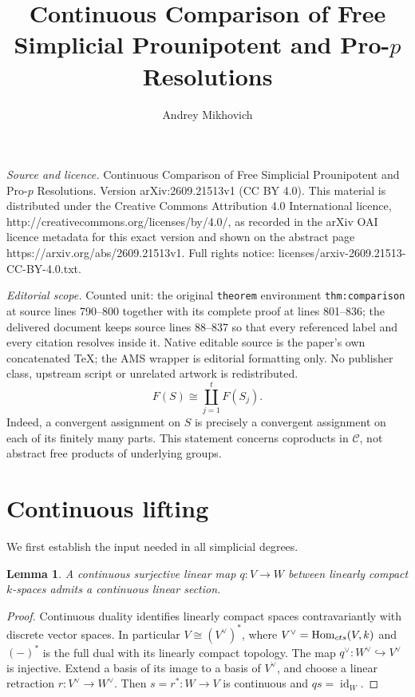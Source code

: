 \documentclass[10pt,a4paper]{amsart}
\newtheorem{lemma}[theorem]{Lemma}
\newcommand{\C}{\mathcal C}
\newcommand{\Hom}{\operatorname{Hom}}
\newcommand{\id}{\operatorname{id}}
\begin{document}
\title[Continuous Comparison of Free Simplicial Prounipotent and Pr]{Continuous Comparison of Free Simplicial Prounipotent and Pro-$p$ Resolutions}
\author{Andrey Mikhovich}
\date{}
\maketitle
\noindent\emph{Source and licence.} Continuous Comparison of Free Simplicial Prounipotent and Pro-$p$ Resolutions. Version arXiv:2609.21513v1 (CC BY 4.0). This material is distributed under the Creative Commons Attribution 4.0 International licence, http://creativecommons.org/licenses/by/4.0/, as recorded in the arXiv OAI licence metadata for this exact version and shown on the abstract page https://arxiv.org/abs/2609.21513v1. Full rights notice: licenses/arxiv-2609.21513-CC-BY-4.0.txt.\par\smallskip
\noindent\textit{Editorial scope.} Counted unit: the original \texttt{theorem} environment \texttt{thm:comparison} at source lines 790--800 together with its complete proof at lines 801--836; the delivered document keeps source lines 88--837 so that every referenced label and every citation resolves inside it. Native editable source is the paper's own concatenated TeX; the AMS wrapper is editorial formatting only. No publisher class, upstream script or unrelated artwork is redistributed.
\begin{equation}\label{eq:partition}
 F(S)\cong\coprod_{j=1}^t F(S_j).
\end{equation}
Indeed, a convergent assignment on $S$ is precisely a convergent
assignment on each of its finitely many parts. This statement concerns
coproducts in $\C$, not abstract free products of underlying groups.

\section{Continuous lifting}

We first establish the input needed in all simplicial degrees.

\begin{lemma}\label{lem:linear}
A continuous surjective linear map $q:V\to W$ between linearly compact
$k$-spaces admits a continuous linear section.
\end{lemma}
\begin{proof}
Continuous duality identifies linearly compact spaces contravariantly with
discrete vector spaces. In particular $V\cong(V^\vee)^*$, where
$V^\vee=\Hom_{\rm cts}(V,k)$ and $(-)^*$ is the full dual with its
linearly compact topology. The map $q^\vee:W^\vee\hookrightarrow V^\vee$
is injective. Extend a basis of its image to a basis of $V^\vee$, and
choose a linear retraction $r:V^\vee\to W^\vee$.
Then $s=r^*:W\to V$ is continuous and $qs=\id_W$.
\end{proof}
\end{document}
